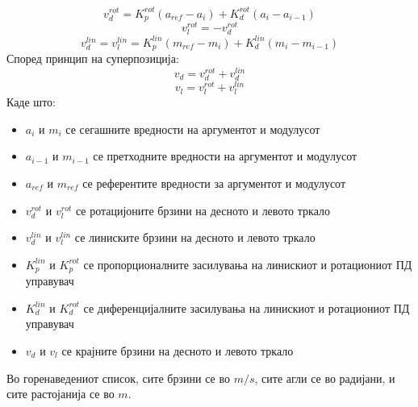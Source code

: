 \documentclass[12pt]{article}
\begin{document}
      $$      v_d^{rot} = K_p^{rot}(a_{ref} - a_i) + K_d^{rot}(a_i - a_{i-1}) $$
      $$      v_l^{rot} = -v_d^{rot}  $$
      $$      v_d^{lin} = v_l^{lin} = K_p^{lin}(m_{ref} - m_i) + K_d^{lin}(m_i - m_{i-1}) $$
      Според принцип на суперпозиција:
      $$      v_d = v_d^{rot} + v_d^{lin} $$
      $$      v_l = v_l^{rot} + v_l^{lin} $$
      Каде што:
      \begin{itemize}
        \item $a_i$ и $m_i$ се сегашните вредности на аргументот и модулусот
        \item $a_{i-1}$ и $m_{i-1}$ се претходните вредности на аргументот и модулусот
        \item $a_{ref}$ и $m_{ref}$ се референтите вредности за аргументот и модулусот
        \item $v_d^{rot}$ и $v_l^{rot}$ се ротацијоните брзини на десното и левото тркало
        \item $v_d^{lin}$ и $v_l^{lin}$ се линиските брзини на десното и левото тркало
        \item $K_p^{lin}$ и $K_p^{rot}$ се пропорционалните засилувања на линискиот и ротациониот ПД управувач
        \item $K_d^{lin}$ и $K_d^{rot}$ се диференцијалните засилувања на линискиот и ротациониот ПД управувач
        \item $v_d$ и $v_l$ се крајните брзини на десното и левото тркало
      \end{itemize}

      Во горенаведениот список, сите брзини се во $m/s$, сите агли се во радијани, и сите растојанија се во $m$.
\end{document}
